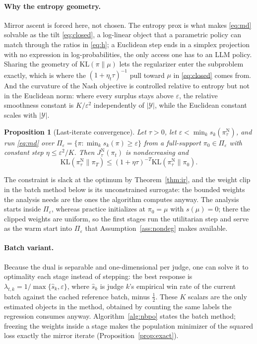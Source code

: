 \documentclass[letterpaper]{article} %
\newtheorem{proposition}{Proposition}
\newcommand{\Y}{\mathcal{Y}}
\newcommand{\KL}{\mathrm{KL}}
\begin{document}
\paragraph{Why the entropy geometry.}
Mirror ascent is forced here, not chosen. The entropy prox is what makes \eqref{eq:md} solvable as the tilt \eqref{eq:closed}, a log-linear object that a parametric policy can match through the ratios in \eqref{eq:h}; a Euclidean step ends in a simplex projection with no expression in log-probabilities, the only access one has to an LLM policy. Sharing the geometry of $\KL(\pi\|\mu)$ lets the regularizer enter the subproblem exactly, which is where the $(1+\eta_t\tau)^{-1}$ pull toward $\mu$ in \eqref{eq:closed} comes from. And the curvature of the Nash objective is controlled relative to entropy but not in the Euclidean norm: where every surplus stays above $\varepsilon$, the relative smoothness constant is $K/\varepsilon^2$ independently of $|\Y|$, while the Euclidean constant scales with $|\Y|$.
\begin{proposition}[Last-iterate convergence]
\label{prop:conv}
Let $\tau>0$, let $\varepsilon<\min_ks_k(\pi^{\mathrm N}_\tau)$, and run \eqref{eq:md} over $\Pi_\varepsilon=\{\pi:\min_ks_k(\pi)\ge\varepsilon\}$ from a full-support $\pi_0\in\Pi_\varepsilon$ with constant step $\eta\le\varepsilon^2/K$. Then $J^{\mathrm N}_\tau(\pi_t)$ is nondecreasing and
\begin{equation*}
\KL(\pi^{\mathrm N}_\tau\|\pi_T)\le(1+\eta\tau)^{-T}\KL(\pi^{\mathrm N}_\tau\|\pi_0).
\end{equation*}
\end{proposition}
The constraint is slack at the optimum by Theorem~\ref{thm:ir}, and the weight clip in the batch method below is its unconstrained surrogate: the bounded weights the analysis needs are the ones the algorithm computes anyway. The analysis starts inside $\Pi_\varepsilon$, whereas practice initializes at $\pi_0=\mu$ with $s(\mu)=0$; there the clipped weights are uniform, so the first stages run the utilitarian step and serve as the warm start into $\Pi_\varepsilon$ that Assumption~\ref{ass:nondeg} makes available.

\paragraph{Batch variant.}
Because the dual is separable and one-dimensional per judge, one can solve it to optimality each stage instead of stepping: the best response is $\lambda_{t,k}=1/\max\{\hat s_k,\varepsilon\}$, where $\hat s_k$ is judge $k$'s empirical win rate of the current batch against the cached reference batch, minus $\tfrac12$. These $K$ scalars are the only estimated objects in the method, obtained by counting the same labels the regression consumes anyway. Algorithm~\ref{alg:nbpo} states the batch method; freezing the weights inside a stage makes the population minimizer of the squared loss exactly the mirror iterate (Proposition~\ref{prop:exact}).
\end{document}
